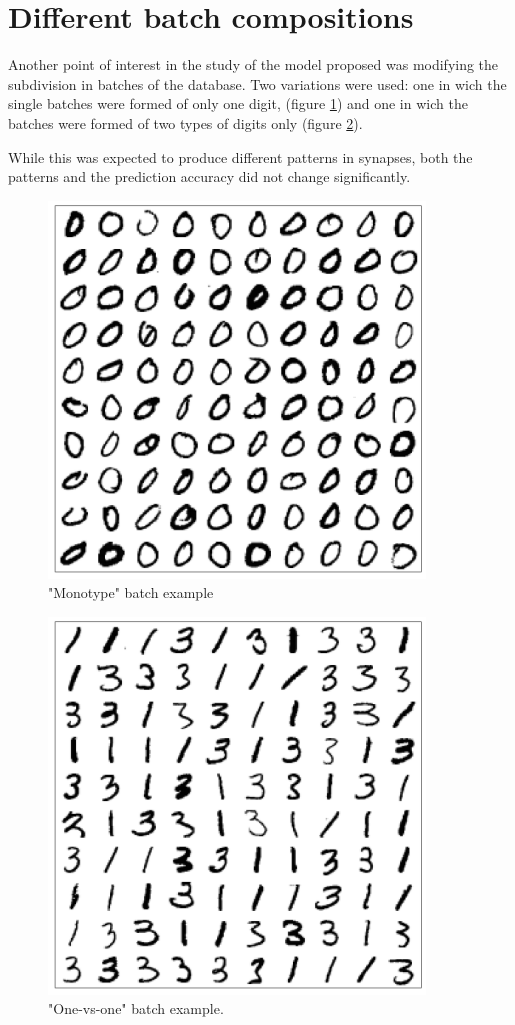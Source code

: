 \documentclass[a4paper]{report}
\begin{document}
\section{Different batch compositions}

Another point of interest in the study of the model proposed was modifying the subdivision in batches of the database. Two variations were used: one in wich the single batches were formed of only one digit, (figure \ref{monotype}) and one in wich the batches were formed of two types of digits only (figure \ref{1v1}).

While this was expected to produce different patterns in synapses, both the patterns and the prediction accuracy did not change significantly.

\begin{figure} [H]
    \centering
    \includegraphics [width=10cm ] {o/0.png}
    \caption{"Monotype" batch example}
    \label{monotype}
\end{figure}

\begin{figure} [H]
    \centering
    \includegraphics [width=10cm ] {o/31.png}
    \caption{"One-vs-one" batch example.}
    \label{1v1}
\end{figure}
\end{document}
